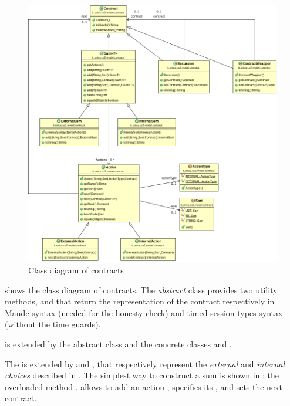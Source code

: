 \begin{figure}
	\centering
	\includegraphics[scale=0.4]{img/class-diag/contracts.png}
	\caption{Class diagram of contracts}
	\label{fig:class-diag-contracts}
\end{figure}

 shows the class diagram of contracts. The \textit{abstract} class  provides two utility methods,  and  that return the  representation of the contract respectively in Maude syntax (needed for the honesty check) and timed session-types syntax (without the time guards).

 is extended by the abstract class  and the concrete classes  and . 

The  is extended by  and , that respectively represent the \textit{external} and \textit{internal choices} described in .
The simplest way to construct a sum is shown in : the overloaded method . allows to add an action , specifies its , and sets the next contract. %
%

